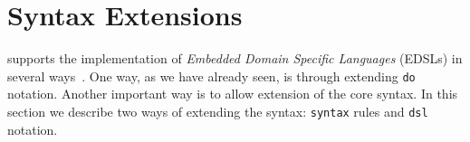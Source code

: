 \section{Syntax Extensions}

\Idris{} supports the implementation of \emph{Embedded Domain Specific Languages} (EDSLs) in several ways~\cite{res-dsl-padl12}.
One way, as we have already seen, is through extending \texttt{do} notation.
Another important way is to allow extension of the core syntax.
In this section we describe two ways of extending the syntax: \texttt{syntax} rules and \texttt{dsl} notation.




